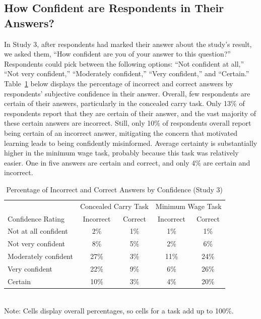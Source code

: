 \documentclass[12pt, letterpaper]{article}
\begin{document}
\clearpage
\subsection{How Confident are Respondents in Their Answers?}
\label{sec:confidence}

In Study 3, after respondents had marked their answer about the study's result, we asked them, ``How confident are you of your answer to this question?'' Respondents could pick between the following options: ``Not confident at all,'' ``Not very confident,'' ``Moderately confident,'' ``Very confident,'' and ``Certain.'' Table~\ref{tab:confidence} below displays the percentage of incorrect and correct answers by respondents' subjective confidence in their answer. Overall, few respondents are certain of their answers, particularly in the concealed carry task. Only 13\% of respondents report that they are certain of their answer, and the vast majority of these certain answers are incorrect. Still, only 10\% of respondents overall report being certain of an incorrect answer, mitigating the concern that motivated learning leads to being confidently misinformed. Average certainty is substantially higher in the minimum wage task, probably because this task was relatively easier. One in five answers are certain and correct, and only 4\% are certain and incorrect.

\singlespacing
\begin{table}[h]
\centering
\caption {Percentage of Incorrect and Correct Answers by Confidence (Study 3)}
\label{tab:confidence}
\begin{tabular}{| l | c  c | c  c | }
\hline 
  & \multicolumn{2}{|c|}{Concealed Carry Task} & \multicolumn{2}{c|}{Minimum Wage Task} \\
Confidence Rating	& Incorrect & Correct  & Incorrect & Correct \\ \hline
Not at all confident	& 2\%	& 1\%	& 1\% 	& 1\% \\ 
Not very confident	& 8\%	& 5\%	& 2\% 	& 6\% \\ 
Moderately confident	& 27\%	& 3\%	& 11\% 	& 24\% \\ 
Very confident		& 22\%	& 9\%	& 6\% 	& 26\% \\ 
Certain			& 10\%	& 3\%	& 4\% 	& 20\% \\ \hline
\end{tabular}
\\Note: Cells display overall percentages, so cells for a task add up to 100\%.
\end{table}

\clearpage

  
\end{document}

